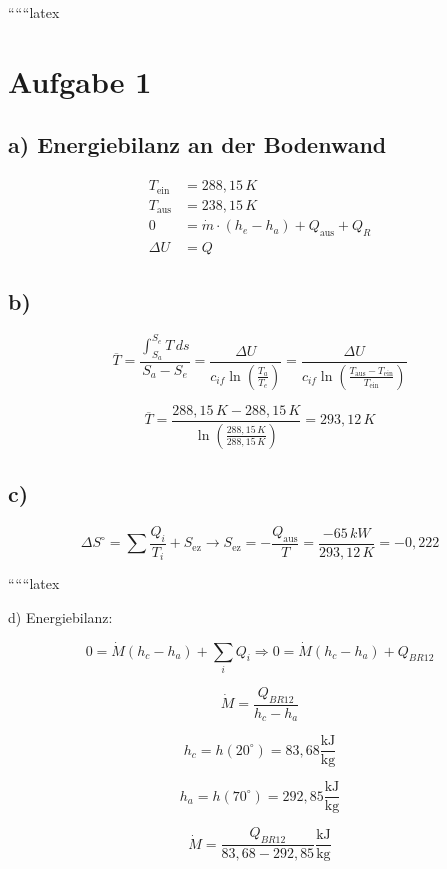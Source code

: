 
``````latex


\section*{Aufgabe 1}

\subsection*{a) Energiebilanz an der Bodenwand}

\begin{align*}
T_{\text{ein}} &= 288,15\,K \\
T_{\text{aus}} &= 238,15\,K \\
0 &= \dot{m} \cdot (h_e - h_a) + Q_{\text{aus}} + Q_R \\
\Delta U &= Q
\end{align*}

\subsection*{b)}

\[
\overline{T} = \frac{\int_{S_a}^{S_e} T \, ds}{S_a - S_e} = \frac{\Delta U}{c_{if} \ln \left( \frac{T_a}{T_e} \right)} = \frac{\Delta U}{c_{if} \ln \left( \frac{T_{\text{aus}} - T_{\text{ein}}}{T_{\text{ein}}} \right)}
\]

\[
\overline{T} = \frac{288,15\,K - 288,15\,K}{\ln \left( \frac{288,15\,K}{288,15\,K} \right)} = 293,12\,K
\]

\subsection*{c)}

\[
\Delta S^{\circ} = \sum \frac{Q_i}{T_i} + S_{\text{ez}} \rightarrow S_{\text{ez}} = -\frac{Q_{\text{aus}}}{T} = \frac{-65\,kW}{293,12\,K} = -0,222
\]

``````latex


d) Energiebilanz:

\[
0 = \dot{M} (h_c - h_a) + \sum_i Q_{i} \Rightarrow 0 = \dot{M} (h_c - h_a) + Q_{BR12}
\]

\[
\dot{M} = \frac{Q_{BR12}}{h_c - h_a}
\]

\[
h_c = h \left( 20^\circ \right) = 83,68 \frac{\text{kJ}}{\text{kg}}
\]

\[
h_a = h \left( 70^\circ \right) = 292,85 \frac{\text{kJ}}{\text{kg}}
\]

\[
\dot{M} = \frac{Q_{BR12}}{83,68 - 292,85} \frac{\text{kJ}}{\text{kg}}
\]

